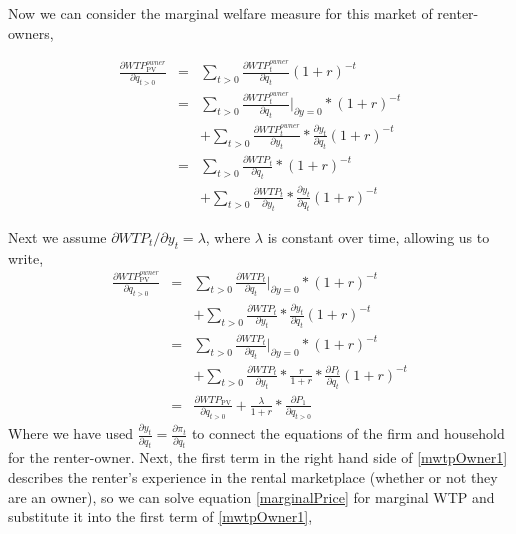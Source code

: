 \documentclass[ecta,nameyear,draft]{econsocart}
\theoremstyle{plain}
\theoremstyle{remark}
\begin{document}
Now we can consider the marginal welfare measure for this market of renter-owners,

\begin{eqnarray}
	\frac{\partial \mathit{WTP}^{\mathit{owner}}_{\mathrm{PV}}}{\partial q_{t>0}}&=&\sum_{t>0} \frac{\partial \mathit{WTP}^{\mathit{owner}}_t}{\partial q_t}(1+r)^{-t} \nonumber\\
	&=&\sum_{t>0}\frac{\partial \mathit{WTP}_t^{\mathit{owner}}}{\partial q_t}|_{\partial y=0}*(1+r)^{-t} \nonumber\\
	&& +\sum_{t>0}\frac{\partial \mathit{WTP}_t^{\mathit{owner}}}{\partial y_t}*\frac{\partial y_t}{\partial q_t}(1+r)^{-t} \nonumber\\
	&=&\sum_{t>0}\frac{\partial \mathit{WTP}_t}{\partial q_t}*(1+r)^{-t}\nonumber\\
	&& +\sum_{t>0}\frac{\partial \mathit{WTP}_t}{\partial y_t}*\frac{\partial y_t}{\partial q_t}(1+r)^{-t} \nonumber
\end{eqnarray}

Next we assume $\partial \mathit{WTP}_t/\partial y_t=\lambda$, where $\lambda$ is constant over time, allowing us to write,
\begin{eqnarray}
	\frac{\partial \mathit{WTP}^{\mathit{owner}}_{\mathrm{PV}}}{\partial q_{t>0}} 
	&=& \sum_{t>0}\frac{\partial \mathit{WTP}_t}{\partial q_t}|_{\partial y=0}*(1+r)^{-t} \nonumber\\
	&& + \sum_{t>0}\frac{\partial \mathit{WTP}_t}{\partial y_t}*\frac{\partial y_t}{\partial q_t}(1+r)^{-t} \label{mwtpOwner0}\\
	&=& \sum_{t>0}\frac{\partial \mathit{WTP}_t}{\partial q_t}|_{\partial y=0}*(1+r)^{-t} \nonumber\\
	&& + \sum_{t>0}\frac{\partial \mathit{WTP}_t}{\partial y_t}*\frac{r}{1+r}*\frac{\partial P_t}{\partial q_t}(1+r)^{-t} \nonumber\\
	&=&\frac{\partial \mathit{WTP_{\mathrm{PV}}}}{\partial q_{t>0}} + \frac{\lambda}{1+r}*\frac{\partial P_1}{\partial q_{t>0}} \label{mwtpOwner1}
\end{eqnarray}
Where we have used $\frac{\partial y_t}{\partial q_t}=\frac{\partial \pi_t}{\partial q_t}$ to connect the equations of the firm and household for the renter-owner. Next, the first term in the right hand side of \ref{mwtpOwner1} describes the renter's experience in the rental marketplace (whether or not they are an owner), so we can solve equation \ref{marginalPrice} for marginal WTP and substitute it into the first term of \ref{mwtpOwner1},
\end{document}
